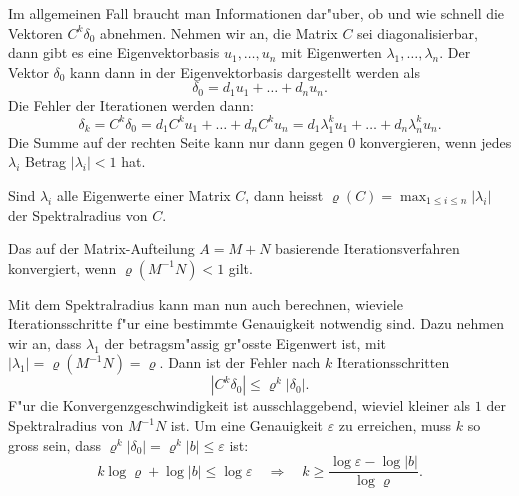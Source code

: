 Im allgemeinen Fall braucht man Informationen dar"uber, ob und wie
schnell die Vektoren $C^k\delta_0$ abnehmen.
Nehmen wir an, die Matrix $C$ sei diagonalisierbar, dann gibt es
eine Eigenvektorbasis $u_1,\dots,u_n$ mit Eigenwerten
$\lambda_1,\dots,\lambda_n$. Der Vektor $\delta_0$ kann dann in der
Eigenvektorbasis dargestellt werden als
\[
\delta_0=d_1u_1+\dots+d_nu_n.
\]
Die Fehler der Iterationen werden dann:
\[
\delta_k
=
C^k\delta_0
=
d_1C^ku_1+\dots+d_nC^ku_n
=
d_1\lambda_1^ku_1+\dots+d_n\lambda_n^ku_n.
\]
Die Summe auf der rechten Seite kann nur dann gegen 0 konvergieren, wenn
jedes $\lambda_i$ Betrag $|\lambda_i|<1$ hat. 

\begin{definition}
Sind $\lambda_i$ alle Eigenwerte einer Matrix $C$, dann heisst
$\varrho(C)=\max_{1\le i\le n}|\lambda_i|$ der Spektralradius
von $C$.
\end{definition}

\begin{satz}
Das auf der Matrix-Aufteilung $A=M+N$ basierende Iterationsverfahren
konvergiert, wenn $\varrho(M^{-1}N)<1$ gilt.
\end{satz}

Mit dem Spektralradius kann man nun auch berechnen, wieviele Iterationsschritte
f"ur eine bestimmte Genauigkeit notwendig sind.
Dazu nehmen wir an, dass $\lambda_1$ der betragsm"assig gr"osste
Eigenwert ist, mit $|\lambda_1|=\varrho(M^{-1}N)=\varrho$.
Dann ist der Fehler nach $k$ Iterationsschritten
\[
|C^k\delta_0|\le \varrho^k|\delta_0|.
\]
F"ur die Konvergenzgeschwindigkeit ist ausschlaggebend, wieviel kleiner
als $1$ der Spektralradius von $M^{-1}N$ ist.
Um eine Genauigkeit $\varepsilon$ zu erreichen, muss $k$ so gross
sein, dass
$\varrho^k|\delta_0|=\varrho^k|b|\le \varepsilon$ ist:
\[
k\log\varrho+\log|b|\le \log\varepsilon
\quad
\Rightarrow
\quad
k\ge \frac{\log\varepsilon-\log|b|}{\log\varrho}.
\]

